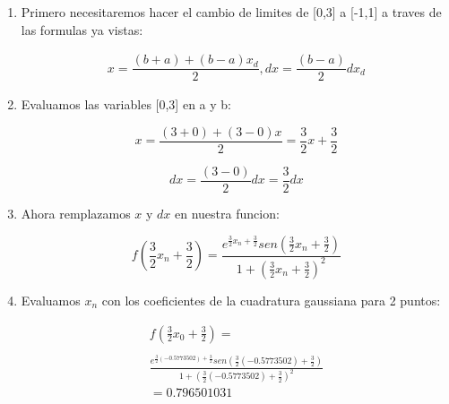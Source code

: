 \documentclass[journal,transmag]{IEEEtran}
\theoremstyle{mytheoremstyle}
\theoremstyle{mytheoremstyle}
\theoremstyle{myproblemstyle}
\begin{document}
                \begin{enumerate}
                    \item Primero necesitaremos hacer el cambio de limites de [0,3] a [-1,1] a traves de las formulas ya vistas:
                    
                    \begin{align*}
                        x=\dfrac{(b+a)+(b-a)x_d}{2},dx=\dfrac{(b-a)}{2}dx_d
                    \end{align*}
                    
                    \item Evaluamos las variables [0,3] en a y b:
                    
                     \begin{equation*}
                        x=\dfrac{(3+0)+(3-0)x}{2}=\dfrac{3}{2}x+\dfrac{3}{2}
                    \end{equation*}
                    
                    \begin{equation*}
                        dx=\dfrac{(3-0)}{2}dx=\dfrac{3}{2}dx
                    \end{equation*}
                    
                    \item Ahora remplazamos $x$ y $dx$ en nuestra funcion:
                    
                    \begin{equation*} 
                        f(\frac{3}{2}x_n+\frac{3}{2})=\frac{e^{\frac{3}{2}x_n+\frac{3}{2}}sen(\frac{3}{2}x_n+\frac{3}{2})}{1+(\frac{3}{2}x_n+\frac{3}{2})^2} 
                    \end{equation*}
                    
                    \item Evaluamos $x_n$ con los coeficientes de la cuadratura gaussiana para 2 puntos: 
                    
                    
                    \begin{multline*}
                        f(\frac{3}{2}x_0+\frac{3}{2})=\\
                        \\
                        \frac{e^{\frac{3}{2}(-0.5773502)+\frac{3}{2}}sen(\frac{3}{2}(-0.5773502)+\frac{3}{2})}{1+(\frac{3}{2}(-0.5773502)+\frac{3}{2})^2} \\
                        =0.796501031
                    \end{multline*}
                    

\end{enumerate}
\end{document}
